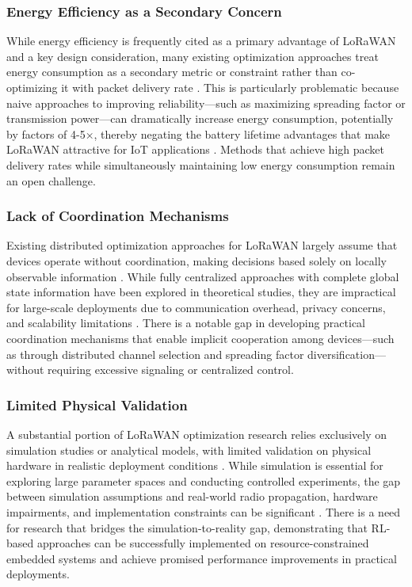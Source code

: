 \documentclass[12pt,a4paper]{article}
\begin{document}
\subsubsection{Energy Efficiency as a Secondary Concern}

While energy efficiency is frequently cited as a primary advantage of LoRaWAN and a key design consideration, many existing optimization approaches treat energy consumption as a secondary metric or constraint rather than co-optimizing it with packet delivery rate \cite{reynders2017power}. This is particularly problematic because naive approaches to improving reliability—such as maximizing spreading factor or transmission power—can dramatically increase energy consumption, potentially by factors of 4-5×, thereby negating the battery lifetime advantages that make LoRaWAN attractive for IoT applications \cite{khaled2020lorawan}. Methods that achieve high packet delivery rates while simultaneously maintaining low energy consumption remain an open challenge.

\subsubsection{Lack of Coordination Mechanisms}

Existing distributed optimization approaches for LoRaWAN largely assume that devices operate without coordination, making decisions based solely on locally observable information \cite{bankov2017should}. While fully centralized approaches with complete global state information have been explored in theoretical studies, they are impractical for large-scale deployments due to communication overhead, privacy concerns, and scalability limitations \cite{slabicki2018adaptive}. There is a notable gap in developing practical coordination mechanisms that enable implicit cooperation among devices—such as through distributed channel selection and spreading factor diversification—without requiring excessive signaling or centralized control.

\subsubsection{Limited Physical Validation}

A substantial portion of LoRaWAN optimization research relies exclusively on simulation studies or analytical models, with limited validation on physical hardware in realistic deployment conditions \cite{bianchi2019experimental}. While simulation is essential for exploring large parameter spaces and conducting controlled experiments, the gap between simulation assumptions and real-world radio propagation, hardware impairments, and implementation constraints can be significant \cite{liando2018real}. There is a need for research that bridges the simulation-to-reality gap, demonstrating that RL-based approaches can be successfully implemented on resource-constrained embedded systems and achieve promised performance improvements in practical deployments.
\end{document}
